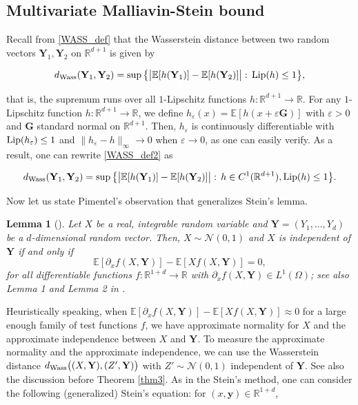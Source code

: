 \documentclass[letterpaper, 11pt,  reqno]{amsart}
\newtheorem{lemma}[theorem]{Lemma}
\newcommand{\noi}{\noindent}
\newcommand{\R}{\mathbb{R}}
\newcommand{\bE}{\mathbb{E}}
\newcommand{\bR}{\mathbb{R}}
\newcommand{\E}{\mathbb{E}}
\newcommand{\cN}{\mathcal{N}}
\newcommand{\eps}{\varepsilon}
\newcommand{\dx}{\partial_x}
\renewcommand{\O}{\Omega}
\newcommand{\Lip}{\textup{Lip}}
\numberwithin{equation}{section}
\numberwithin{theorem}{section}
\begin{document}
 

 
\subsection{Multivariate Malliavin-Stein bound}
\label{SEC4_2}
Recall from \eqref{WASS_def} that the Wasserstein distance between 
two random vectors $\mathbf{Y}_1, \mathbf{Y}_2$ on $\R^{d+1}$ is given by 

\noi
\begin{align}\label{WASS_def2}
d_{\rm Wass}( \mathbf{Y}_1, \mathbf{Y}_2 ) =
 \sup\big\{   \big| \E[ h( \mathbf{Y}_1)] -  \E[ h(\mathbf{Y}_2)] \big| : \,  \Lip( h) \leq 1 \big\},
\end{align}

\noi
that is, the supremum runs over all $1$-Lipschitz functions $h: \R^{d+1}\to\R$.
For any $1$-Lipschitz function $h: \R^{d+1}\to\R$, we define $h_\eps(x) =\E[ h( x+ \eps \mathbf{G} ) ]$ 
with $\eps > 0$ and  $\mathbf{G}$ standard normal on $\R^{d+1}$. 
Then, 
$h_\eps$ is continuously differentiable with $\Lip(h_\eps) \leq 1$
and $\| h_\eps - h \|_\infty\to 0$ when $\eps\to 0$,
as one can easily verify. As a result, one can rewrite \eqref{WASS_def2} as 


\noi
\begin{align}\label{WASS_def3}
d_{\rm Wass}( \mathbf{Y}_1, \mathbf{Y}_2 ) =
 \sup\big\{   \big| \E[ h( \mathbf{Y}_1)] - 
  \E[ h(\mathbf{Y}_2)] \big| : \,  h\in C^1(\R^{d+1}), \Lip( h) \leq 1 \big\}.
\end{align}
 

Now let us state   Pimentel's observation that generalizes Stein's lemma. 

\begin{lemma}[\cite{pimentel}]
Let $X$ be a real, integrable random variable
and $\mathbf{Y}=(Y_1, ... , Y_d)$ be a $d$-dimensional 
random vector. Then, 
 $X \sim \cN(0, 1)$ and $X$ is independent of $\mathbf{Y}$   if and only if 
\[
  \bE[\partial_x f(X, \mathbf{Y})]-\bE[Xf(X,\mathbf{Y})]=0,
\]
for all differentiable functions $f:\bR^{1+d}\to \R$ 
with $\dx f(X, \mathbf{Y})  \in L^1(\O)$; see also Lemma 1 and Lemma 2 in \cite{tudor23}.
\end{lemma}

Heuristically speaking, when 
$ \bE[\partial_x f(X, \mathbf{Y})]-\bE[ Xf(X,\mathbf{Y})] \approx 0$
for a large enough family of test functions $f$, 
we have approximate normality for $X$
and the approximate independence between $X$ and $\mathbf{Y}$.
To measure the approximate normality and the approximate independence, 
we can use the   Wasserstein distance
$
d_{\rm Wass}\big(  (X, \mathbf{Y}),   (Z', \mathbf{Y})   \big)
$
with $Z'\sim\cN(0,1)$ independent of $\mathbf{Y}$.
See also the discussion before Theorem \ref{thm3}.
As in the Stein's method, one can consider the following (generalized) 
Stein's equation: for $(x,\pmb{y}) \in \bR^{1+d}$,
\end{document}
